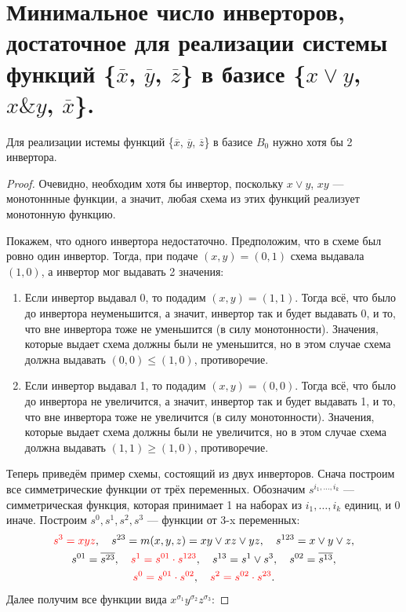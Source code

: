 \section{Минимальное число инверторов, достаточное для реализации системы функций \{$\overline{x}$, $\overline{y}$, $\overline{z}$\} в базисе \{$x\vee y$, $x \& y$, $\overline{x}$\}.}

\begin{theorem}
    Для реализации истемы функций \{$\overline{x}$, $\overline{y}$, $\overline{z}$\} в базисе $B_0$ нужно хотя бы 2 инвертора.
\end{theorem}

\begin{proof}
    Очевидно, необходим хотя бы инвертор, поскольку $x\vee y$, $xy$ --- монотоннные функции, а значит, любая схема из этих функций реализует монотонную функцию.

    Покажем, что одного инвертора недостаточно. Предположим, что в схеме был ровно один инвертор. Тогда, при подаче $(x, y) = (0, 1)$ схема выдавала $(1, 0)$, а инвертор мог выдавать 2 значения:
    \begin{enumerate}
        \item Если инвертор выдавал 0, то подадим $(x,y) = (1, 1)$. Тогда всё, что было до инвертора неуменьшится, а значит, инвертор так и будет выдавать 0, и то, что вне инвертора тоже не уменьшится (в силу монотонности). Значения, которые выдает схема должны были не уменьшится, но в этом случае схема должна выдавать $(0, 0)\leqslant (1, 0)$, противоречие.
        \item Если инвертор выдавал 1, то подадим $(x, y) = (0, 0)$. Тогда всё, что было до инвертора не увеличится, а значит, инвертор так и будет выдавать 1, и то, что вне инвертора тоже не увеличится (в силу монотонности). Значения, которые выдает схема должны были не увеличится, но в этом случае схема должна выдавать $(1, 1)\geqslant(1, 0)$, противоречие.
    \end{enumerate}

    Теперь приведём пример схемы, состоящий из двух инверторов. Снача построим все симметрические функции от трёх переменных. Обозначим $s^{i_1, \ldots, i_k}$ --- симметрическая функция, которая принимает 1 на наборах из $i_1, \ldots, i_k$ единиц, и 0 иначе. Построим $s^0, s^1, s^2, s^3$ --- функции от 3-x переменных:
    \begin{gather*}
        \textcolor{red}{s^3 = xyz},\quad s^{23} = m(x, y, z) = xy\vee xz\vee yz, \quad s^{123} = x\vee y \vee z,\\
        s^{01} = \overline{s^{23}}, \quad \textcolor{red}{s^1 = s^{01} \cdot  s^{123}}, \quad s^{13} = s^1 \vee s^3, \quad s^{02} = \overline{s^{13}},\\
        \textcolor{red}{s^0 = s^{01} \cdot s^{02}}, \quad \textcolor{red}{s^2 = s^{02}\cdot s^{23}}.
    \end{gather*}
Далее получим все функции вида $x^{\sigma_1}y^{\sigma_2}z^{\sigma_3}$:


\end{proof}
